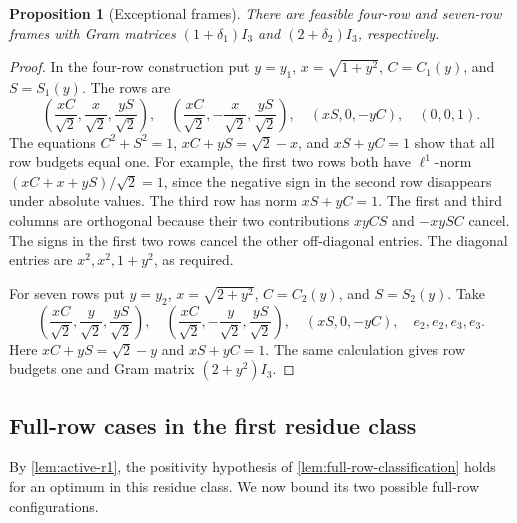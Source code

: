 \documentclass[11pt]{article}
\numberwithin{equation}{section}
\newtheorem{proposition}[proposition]{Proposition}
\theoremstyle{definition}
\theoremstyle{definition}
\begin{document}
\begin{proposition}[Exceptional frames]
\label{prop:exceptional-frames}
There are feasible four-row and seven-row frames with Gram matrices
$(1+\delta_1)I_3$ and $(2+\delta_2)I_3$, respectively.
\end{proposition}
\begin{proof}
In the four-row construction put $y=y_1$, $x=\sqrt{1+y^2}$,
$C=C_1(y)$, and $S=S_1(y)$.  The rows are
\begin{equation}
 \left(\frac{xC}{\sqrt2},\frac{x}{\sqrt2},\frac{yS}{\sqrt2}\right),\quad
 \left(\frac{xC}{\sqrt2},-\frac{x}{\sqrt2},\frac{yS}{\sqrt2}\right),\quad
 (xS,0,-yC),\quad (0,0,1).
 \label{eq:four-frame}
\end{equation}
The equations $C^2+S^2=1$,
$xC+yS=\sqrt2-x$, and $xS+yC=1$ show that all row budgets equal one.
For example, the first two rows both have $\ell^1$-norm
$(xC+x+yS)/\sqrt2=1$, since the negative sign in the second row
disappears under absolute values.  The third row has norm
$xS+yC=1$.  The first and third columns are orthogonal because their two
contributions $xyCS$ and $-xySC$ cancel.  The signs in the first two
rows cancel the other off-diagonal entries.  The diagonal entries are
$x^2,x^2,1+y^2$, as required.

For seven rows put $y=y_2$, $x=\sqrt{2+y^2}$,
$C=C_2(y)$, and $S=S_2(y)$.  Take
\begin{equation}
 \left(\frac{xC}{\sqrt2},\frac{y}{\sqrt2},\frac{yS}{\sqrt2}\right),\quad
 \left(\frac{xC}{\sqrt2},-\frac{y}{\sqrt2},\frac{yS}{\sqrt2}\right),\quad
 (xS,0,-yC),\quad e_2,e_2,e_3,e_3.
 \label{eq:seven-frame}
\end{equation}
Here $xC+yS=\sqrt2-y$ and $xS+yC=1$.  The same calculation gives row
budgets one and Gram matrix $(2+y^2)I_3$.
\end{proof}

\subsection{Full-row cases in the first residue class}
By \cref{lem:active-r1}, the positivity hypothesis of
\cref{lem:full-row-classification} holds for an optimum in this
residue class. We now bound its two possible full-row configurations.
\end{document}
